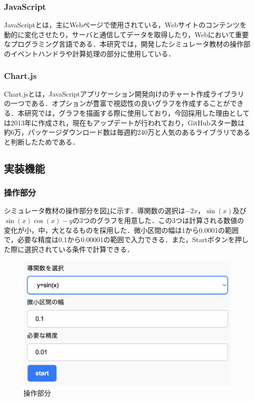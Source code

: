 \documentclass[a4paper, 12pt]{ltjsarticle}
\begin{document}
\subsubsection{JavaScript}
JavaScriptとは，主にWebページで使用されている，Webサイトのコンテンツを動的に変化させたり，サーバと通信してデータを取得したり，Webにおいて重要なプログラミング言語である．本研究では，開発したシミュレータ教材の操作部のイベントハンドラや計算処理の部分に使用している．
\subsubsection{Chart.js}
Chart.jsとは，JavaScriptアプリケーション開発向けのチャート作成ライブラリの一つである．オプションが豊富で視認性の良いグラフを作成することができる．本研究では，グラフを描画する際に使用しており，今回採用した理由としては2013年に作成され，現在もアップデートが行われており，GitHubスター数は約6万，パッケージダウンロード数は毎週約240万と人気のあるライブラリであると判断したためである．
\clearpage
\subsection{実装機能}
\subsubsection{操作部分}
シミュレータ教材の操作部分を図\ref{fig:操作部分}に示す．導関数の選択は$-2x$，$\sin(x)$及び$\sin(x)\cos(x)-y$の3つのグラフを用意した．この3つは計算される数値の変化が小，中，大となるものを採用した．微小区間の幅は1から0.0001の範囲で，必要な精度は0.1から0.00001の範囲で入力できる．また，Startボタンを押した際に選択されている条件で計算できる．

\begin{figure}[h]
\begin{center}
\includegraphics[clip,width=\textwidth,keepaspectratio]{sim-sousa.png}
\end{center}
\caption{操作部分}
\label{fig:操作部分}
\end{figure}
\clearpage
\end{document}
